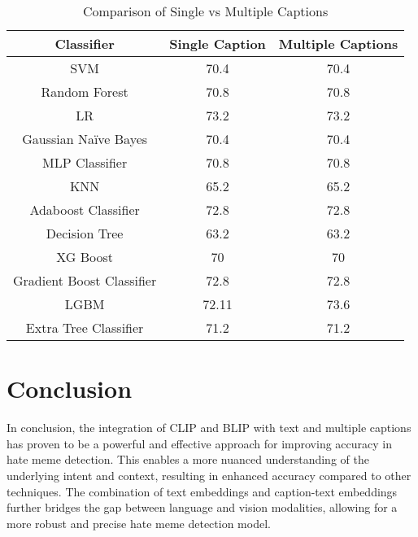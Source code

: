 \documentclass{ieeeaccess}
\begin{document}
\begin{table}[htbp]
\caption{Comparison of Single vs Multiple Captions}
\label{tab:single_vs_multiple_captions}
\centering
\begin{tabular}{|c|c|c|}
\hline
\textbf{Classifier} & \textbf{Single Caption} & \textbf{Multiple Captions} \\
\hline
SVM & 70.4 & 70.4 \\
Random Forest & 70.8 & 70.8 \\
LR & 73.2 & 73.2 \\
Gaussian Naïve Bayes & 70.4 & 70.4 \\
MLP Classifier & 70.8 & 70.8 \\
KNN & 65.2 & 65.2 \\
Adaboost Classifier & 72.8 & 72.8 \\
Decision Tree & 63.2 & 63.2 \\
XG Boost & 70 & 70 \\
Gradient Boost Classifier & 72.8 & 72.8 \\
LGBM & 72.11 & 73.6 \\
Extra Tree Classifier & 71.2 & 71.2 \\
\hline
\end{tabular}
\end{table}

\section{Conclusion}
\label{sec:conclusion}

In conclusion, the integration of CLIP and BLIP with text and multiple captions has proven to be a powerful and effective approach for improving accuracy in hate meme detection. This enables a more nuanced understanding of the underlying intent and context, resulting in enhanced accuracy compared to other techniques. The combination of text embeddings and caption-text embeddings further bridges the gap between language and vision modalities, allowing for a more robust and precise hate meme detection model.
\end{document}
